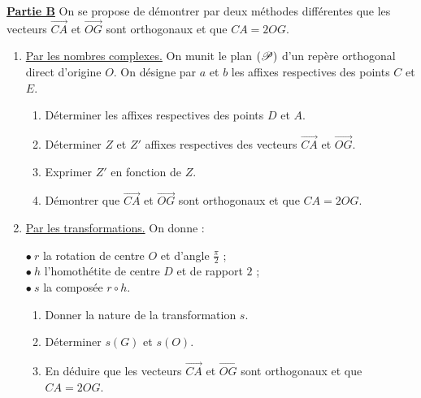       \underline{\textbf{Partie B}} \newline
      On se propose de d\'emontrer par deux m\'ethodes diff\'erentes que les vecteurs 
      $\overrightarrow{CA}$ et $\overrightarrow{OG}$ sont orthogonaux et que $CA = 2 OG$.
      \begin{enumerate}
            \item \underline{Par les nombres complexes.} \newline
                  On munit le plan $(\mathscr{P})$ d'un rep\`ere orthogonal direct d'origine $O$.
                  On d\'esigne par $a$ et $b$ les affixes respectives des points $C$ et $E$.
                  \begin{enumerate}
                        \item D\'eterminer les affixes respectives des points $D$ et $A$.
                        \item D\'eterminer $Z$ et $Z'$ affixes respectives des vecteurs 
                              $\overrightarrow{CA}$ et $\overrightarrow{OG}$.
                        \item Exprimer $Z'$ en fonction de $Z$.
                        \item D\'emontrer que $\overrightarrow{CA}$ et $\overrightarrow{OG}$ sont orthogonaux et que $CA = 2 OG$.
                  \end{enumerate}
            \item \underline{Par les transformations.} \newline
                  On donne : 
                  \begin{mitanisa}
                        $\bullet\ r$ la rotation de centre $O$ et d'angle $\frac{\pi}{2}$ ; \\
                        $\bullet\ h$ l'homoth\'etite de centre $D$ et de rapport $2$ ; \\
                        $\bullet\ s$ la compos\'ee $r \circ h$.
                  \end{mitanisa}
                  \begin{enumerate}
                        \item Donner la nature de la transformation $s$.
                        \item D\'eterminer $s(G)$ et $s(O)$.
                        \item En d\'eduire que les vecteurs $\overrightarrow{CA}$ et $\overrightarrow{OG}$
                              sont orthogonaux et que $CA = 2 OG$.
                  \end{enumerate}
      \end{enumerate}
      
